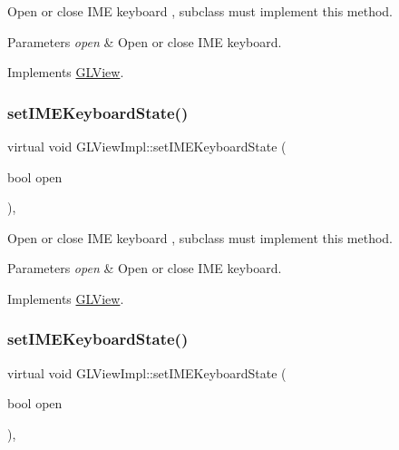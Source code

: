 Open or close I\+ME keyboard , subclass must implement this method.


\begin{DoxyParams}{Parameters}
{\em open} & Open or close I\+ME keyboard. \\
\hline
\end{DoxyParams}


Implements \hyperlink{classGLView_aaa70edad9dd4b2052237867db978e06d}{G\+L\+View}.

\mbox{\label{classGLViewImpl_a37e04acaf52f6258ebe98d6b36c3b6c3}} 
\subsubsection{\texorpdfstring{set\+I\+M\+E\+Keyboard\+State()}{setIMEKeyboardState()}\hspace{0.1cm}{\footnotesize\ttfamily [7/9]}}
{\footnotesize\ttfamily virtual void G\+L\+View\+Impl\+::set\+I\+M\+E\+Keyboard\+State (\begin{DoxyParamCaption}\item[{bool}]{open }\end{DoxyParamCaption})\hspace{0.3cm}{\ttfamily [override]}, {\ttfamily [virtual]}}

Open or close I\+ME keyboard , subclass must implement this method.


\begin{DoxyParams}{Parameters}
{\em open} & Open or close I\+ME keyboard. \\
\hline
\end{DoxyParams}


Implements \hyperlink{classGLView_aaa70edad9dd4b2052237867db978e06d}{G\+L\+View}.

\mbox{\label{classGLViewImpl_a37e04acaf52f6258ebe98d6b36c3b6c3}} 
\subsubsection{\texorpdfstring{set\+I\+M\+E\+Keyboard\+State()}{setIMEKeyboardState()}\hspace{0.1cm}{\footnotesize\ttfamily [8/9]}}
{\footnotesize\ttfamily virtual void G\+L\+View\+Impl\+::set\+I\+M\+E\+Keyboard\+State (\begin{DoxyParamCaption}\item[{bool}]{open }\end{DoxyParamCaption})\hspace{0.3cm}{\ttfamily [override]}, {\ttfamily [virtual]}}

